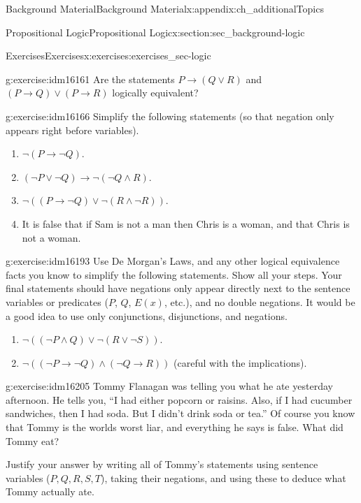\documentclass[oneside,10pt,]{book}
\numberwithin{equation}{chapter}
\def\imp{\rightarrow}
\begin{document}
\begin{appendixptx}{Background Material}{}{Background Material}{}{}{x:appendix:ch_additionalTopics}
\begin{sectionptx}{Propositional Logic}{}{Propositional Logic}{}{}{x:section:sec_background-logic}
\begin{exercises-subsection}{Exercises}{}{Exercises}{}{}{x:exercises:exercises_sec-logic}
\begin{divisionexercise}{6}{}{}{g:exercise:idm16161}%
Are the statements \(P \imp (Q\vee R)\) and \((P \imp Q) \vee (P \imp R)\) logically equivalent?%
\end{divisionexercise}%
\begin{divisionexercise}{7}{}{}{g:exercise:idm16166}%
Simplify the following statements (so that negation only appears right before variables).%
\par
%
\begin{enumerate}[label=(\alph*)]
\item{}\(\neg(P \imp \neg Q)\).%
\item{}\((\neg P \vee \neg Q) \imp \neg (\neg Q \wedge R)\).%
\item{}\(\neg((P \imp \neg Q) \vee \neg (R \wedge \neg R))\).%
\item{}It is false that if Sam is not a man then Chris is a woman, and that Chris is not a woman.%
\end{enumerate}
%
\end{divisionexercise}%
\begin{divisionexercise}{8}{}{}{g:exercise:idm16193}%
Use De Morgan's Laws, and any other logical equivalence facts you know to simplify the following statements. Show all your steps. Your final statements should have negations only appear directly next to the sentence variables or predicates (\(P\), \(Q\), \(E(x)\), etc.), and no double negations. It would be a good idea to use only conjunctions, disjunctions, and negations.%
\par
%
\begin{enumerate}[label=(\alph*)]
\item{}\(\neg((\neg P \wedge Q) \vee \neg(R \vee \neg S))\). %
\item{}\(\neg((\neg P \imp \neg Q) \wedge (\neg Q \imp R))\) (careful with the implications). %
\end{enumerate}
%
\end{divisionexercise}%
\begin{divisionexercise}{9}{}{}{g:exercise:idm16205}%
Tommy Flanagan was telling you what he ate yesterday afternoon. He tells you, ``I had either popcorn or raisins. Also, if I had cucumber sandwiches, then I had soda. But I didn't drink soda or tea.'' Of course you know that Tommy is the worlds worst liar, and everything he says is false. What did Tommy eat?%
\par
Justify your answer by writing all of Tommy's statements using sentence variables (\(P, Q, R, S, T\)), taking their negations, and using these to deduce what Tommy actually ate.%

\end{divisionexercise}
\end{exercises-subsection}
\end{sectionptx}
\end{appendixptx}
\end{document}
